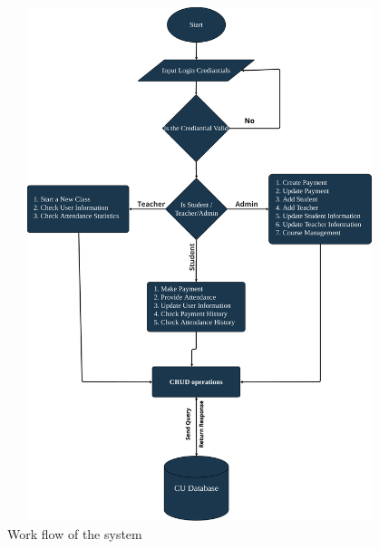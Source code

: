 \clearpage

\begin{figure}[H]
    \centering
    \label{fig:flowchart}
    \includegraphics[height=15cm, width=1\textwidth]{images/flowchart}
    \caption{Work flow of the system}
\end{figure}

\clearpage